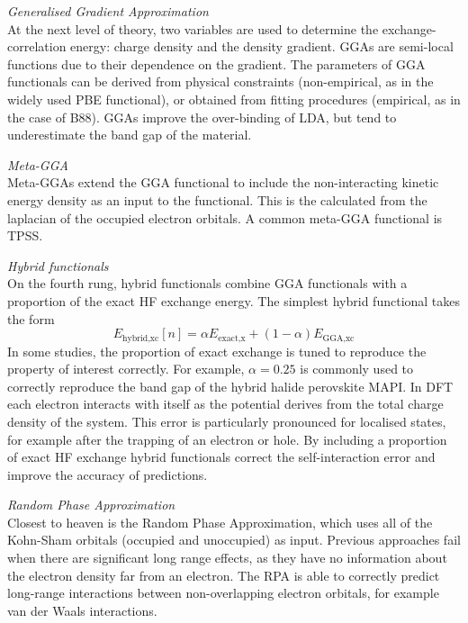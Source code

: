 \textit{Generalised Gradient Approximation} \\
At the next level of theory, two variables are used to determine the exchange-correlation energy: charge density and the density gradient. GGAs are semi-local functions due to their dependence on the gradient. The parameters of GGA functionals can be derived from physical constraints (non-empirical, as in the widely used PBE functional), or obtained from fitting procedures (empirical, as in the case of B88). GGAs improve the over-binding of LDA, but tend to underestimate the band gap of the material.

\textit{Meta-GGA} \\
Meta-GGAs extend the GGA functional to include the non-interacting kinetic energy density as an input to the functional. This is the calculated from the laplacian of the occupied electron orbitals.
A common meta-GGA functional is TPSS.

\textit{Hybrid functionals} \\
On the fourth rung, hybrid functionals combine GGA functionals with a proportion of the exact HF exchange energy. The simplest hybrid functional takes the form
$$
E_{\textrm{hybrid,xc}}\left[n\right] = \alpha E_{\textrm{exact,x}} + \left(1-\alpha\right)E_{\textrm{GGA,xc}}
$$
In some studies, the proportion of exact exchange is tuned to reproduce the property of interest correctly. For example, $\alpha=0.25$ is commonly used to correctly reproduce the band gap of the hybrid halide perovskite MAPI.%
In DFT each electron interacts with itself as the potential derives from the total charge density of the system. This error is particularly pronounced for localised states, for example after the trapping of an electron or hole. By including a proportion of exact HF exchange hybrid functionals correct the self-interaction error and improve the accuracy of predictions.

\textit{Random Phase Approximation} \\
Closest to heaven is the Random Phase Approximation, which uses all of the Kohn-Sham orbitals (occupied and unoccupied) as input. Previous approaches fail when there are significant long range effects, as they have no information about the electron density far from an electron. The RPA is able to correctly predict long-range interactions between non-overlapping electron orbitals, for example van der Waals interactions.

